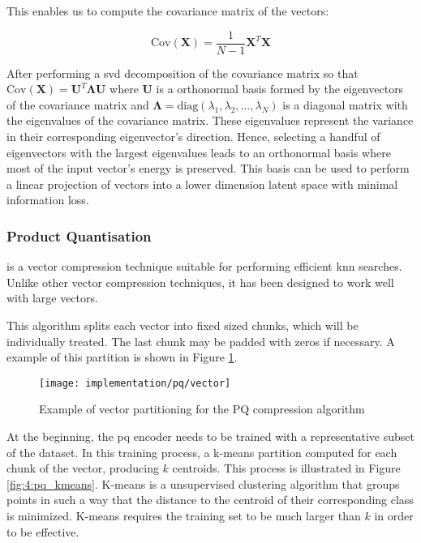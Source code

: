 \documentclass[../main.tex]{subfiles}
\begin{document}
This enables us to compute the covariance matrix of the vectors:

\begin{equation}
    \text{Cov}(\bm{X}) = \frac{1}{N-1} \bm{X}^T \bm{X}
\end{equation}

After performing a \gls{svd} decomposition of the covariance matrix so that $\text{Cov}(\bm{X}) = \bm{U}^T \bm{\Lambda} \bm{U}$ where $\bm{U}$ is a orthonormal basis formed by the eigenvectors of the covariance matrix and $\bm{\Lambda} = \text{diag}(\lambda_1, \lambda_2, \dots, \lambda_N)$ is a diagonal matrix with the eigenvalues of the covariance matrix. These eigenvalues represent the variance in their corresponding eigenvector's direction. Hence, selecting a handful of eigenvectors with the largest eigenvalues leads to an orthonormal basis where most of the input vector's energy is preserved.  This basis can be used to perform a linear projection of vectors into a lower dimension latent space with minimal information loss.
 
\subsubsection{Product Quantisation}
 is a vector compression technique suitable for performing efficient \gls{knn} searches. Unlike other vector compression techniques, it has been designed to work well with large vectors\cite{chang2022a}\cite{jegou2011}.

This algorithm splits each vector into fixed sized chunks, which will be individually treated. The last chunk may be padded with zeros if necessary. A example of this partition is shown in Figure \ref{fig:4:pq_division}.

\begin{figure}[htbp]
    \centering
    \texttt{[image: implementation/pq/vector]}
    \caption{Example of vector partitioning for the PQ compression algorithm}
    \label{fig:4:pq_division}
\end{figure}

At the beginning, the \gls{pq} encoder needs to be trained with a representative subset of the dataset. In this training process, a k-means partition computed for each chunk of the vector, producing $k$ centroids. This process is illustrated in Figure \ref{fig:4:pq_kmeans}. K-means is a unsupervised clustering algorithm that groups points in such a way that the distance to the centroid of their corresponding class is minimized\cite{sontag2012}. K-means requires the training set to be much larger than $k$ in order to be effective.
\end{document}
